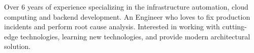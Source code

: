 

\begin{cvparagraph}

Over 6 years of experience specializing in the infrastructure automation, cloud computing and backend development. An Engineer who loves to fix production incidents and perform root cause analysis. Interested in working with cutting-edge technologies, learning new technologies, and provide modern architectural solution.
\end{cvparagraph}
